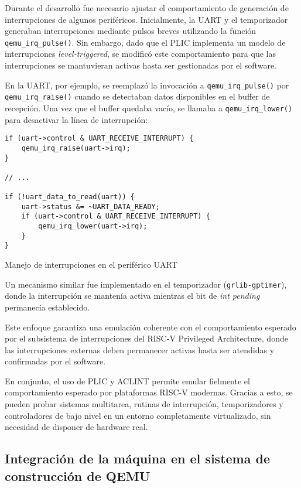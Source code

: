 Durante el desarrollo fue necesario ajustar el comportamiento de generación de interrupciones de algunos periféricos. Inicialmente, la UART y el temporizador generaban interrupciones mediante pulsos breves utilizando la función \texttt{qemu\_irq\_pulse()}. Sin embargo, dado que el PLIC implementa un modelo de interrupciones \emph{level-triggered}, se modificó este comportamiento para que las interrupciones se mantuvieran activas hasta ser gestionadas por el software.

En la UART, por ejemplo, se reemplazó la invocación a \texttt{qemu\_irq\_pulse()} por \texttt{qemu\_irq\_raise()} cuando se detectaban datos disponibles en el buffer de recepción. Una vez que el buffer quedaba vacío, se llamaba a \texttt{qemu\_irq\_lower()} para desactivar la línea de interrupción:

\begin{codefloat}
\begin{lstlisting}[style=CppExample]
if (uart->control & UART_RECEIVE_INTERRUPT) {
    qemu_irq_raise(uart->irq);
}

// ...

if (!uart_data_to_read(uart)) {
    uart->status &= ~UART_DATA_READY;
    if (uart->control & UART_RECEIVE_INTERRUPT) {
        qemu_irq_lower(uart->irq);
    }
}
\end{lstlisting}
\caption{Manejo de interrupciones en el periférico UART}
\end{codefloat}

Un mecanismo similar fue implementado en el temporizador (\texttt{grlib-gptimer}), donde la interrupción se mantenía activa mientras el bit de \emph{int pending} permanecía establecido.

Este enfoque garantiza una emulación coherente con el comportamiento esperado por el subsistema de interrupciones del RISC-V Privileged Architecture, donde las interrupciones externas deben permanecer activas hasta ser atendidas y confirmadas por el software.


\vspace{1em}
En conjunto, el uso de PLIC y ACLINT permite emular fielmente el comportamiento esperado por plataformas RISC-V modernas. Gracias a esto, se pueden probar sistemas multitarea, rutinas de interrupción, temporizadores y controladores de bajo nivel en un entorno completamente virtualizado, sin necesidad de disponer de hardware real.


\subsection{Integración de la máquina en el sistema de construcción de QEMU}
\label{subsec:integracion-meson-kconfig}

